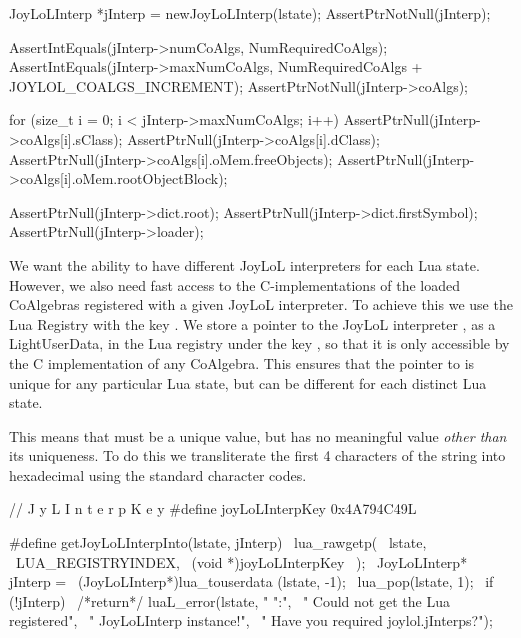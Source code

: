
\startCTest
  JoyLoLInterp *jInterp = newJoyLoLInterp(lstate);
  AssertPtrNotNull(jInterp);
  
  AssertIntEquals(jInterp->numCoAlgs,
    NumRequiredCoAlgs);
  AssertIntEquals(jInterp->maxNumCoAlgs,
    NumRequiredCoAlgs + JOYLOL_COALGS_INCREMENT);
  AssertPtrNotNull(jInterp->coAlgs);
  
  for (size_t i = 0; i < jInterp->maxNumCoAlgs; i++) {
    AssertPtrNull(jInterp->coAlgs[i].sClass);
    AssertPtrNull(jInterp->coAlgs[i].dClass);
    AssertPtrNull(jInterp->coAlgs[i].oMem.freeObjects);
    AssertPtrNull(jInterp->coAlgs[i].oMem.rootObjectBlock);
  }
  
  AssertPtrNull(jInterp->dict.root);
  AssertPtrNull(jInterp->dict.firstSymbol);
  AssertPtrNull(jInterp->loader);
\stopCTest
\stopTestCase
\stopTestSuite


We want the ability to have different JoyLoL interpreters for each Lua 
state. However, we also need fast access to the C-implementations of the 
loaded CoAlgebras registered with a given JoyLoL interpreter. To achieve 
this we use the Lua Registry with the  key 
. We store a pointer to the JoyLoL interpreter 
, as a LightUserData, in the Lua registry under the key 
, so that it is only accessible by the C 
implementation of any CoAlgebra. This ensures that the pointer to 
 is unique for any particular Lua state, but can be 
different for each distinct Lua state. 

This means that  must be a unique value, but has no 
meaningful value \emph{other than} its uniqueness. To do this we 
transliterate the first 4 characters of the string  
into hexadecimal using the standard  character codes. 

\startCHeader
//                         J y L I n t e r p K e y
#define joyLoLInterpKey 0x4A794C49L

#define getJoyLoLInterpInto(lstate, jInterp)      \
  lua_rawgetp(                                    \
    lstate,                                       \
    LUA_REGISTRYINDEX,                            \
    (void *)joyLoLInterpKey                       \
  );                                              \
  JoyLoLInterp* jInterp =                         \
    (JoyLoLInterp*)lua_touserdata (lstate, -1);   \
  lua_pop(lstate, 1);                             \
  if (!jInterp) {                                 \
    /*return*/ luaL_error(lstate, "%
      "\nERROR:\n",                               \
      "  Could not get the Lua registered\n",     \
      "  JoyLoLInterp instance!\n",               \
      "  Have you required joylol.jInterps?\n");  \
  }
\stopCHeader

